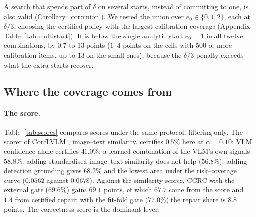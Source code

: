 A search that spends part of $\delta$ on several starts, instead of committing to one, is also valid (Corollary~\ref{cor:union}). We tested the union over $e_0\in\{0,1,2\}$, each at $\delta/3$, choosing the certified policy with the largest calibration coverage (Appendix Table~\ref{tab:multistart}). It is below the single analytic start $e_0=1$ in all twelve combinations, by $0.7$ to $13$ points ($1$--$4$ points on the cells with $500$ or more calibration items, up to $13$ on the small ones), because the $\delta/3$ penalty exceeds what the extra starts recover.

\begin{table}[t]
\centering
\caption{Certified coverage (\%) and abort rate (\%) at $\alpha=0.10$ as the start of the fixed sequence varies,
filtering and CCRC with the fit-fold gate (Appendix~\ref{app:ladder} for $\alpha=0.05$ and $0.15$).}
\label{tab:start}
\scriptsize
\resizebox{\textwidth}{!}{}
\end{table}

\subsection{Where the coverage comes from}
\label{sec:score}

\paragraph{The score.}
Table~\ref{tab:scores} compares scores under the same protocol, filtering only. The scorer of ConfLVLM \citep{conflvlm},
image--text similarity, certifies $0.5\%$ here at $\alpha=0.10$;
VLM confidence alone certifies $41.0\%$; a learned combination of the VLM's own signals $58.8\%$; adding
standardised image--text similarity does not help ($56.8\%$); adding detection grounding gives $68.2\%$ and the
lowest area under the risk--coverage curve ($0.0562$ against $0.0678$). Against the similarity scorer, CCRC with the external gate ($69.6\%$) gains $69.1$ points, of which $67.7$ come from the score and $1.4$ from certified
repair; with the fit-fold gate ($77.0\%$) the repair share is $8.8$ points. The correctness score is the dominant lever.

\begin{table}[t]
\centering
\caption{POPE-1500, filtering only: certified coverage (\%) with abort rate in parentheses, and area under the
risk--coverage curve at $\alpha=0.10$ (lower is better).}
\label{tab:scores}
\small

\end{table}

